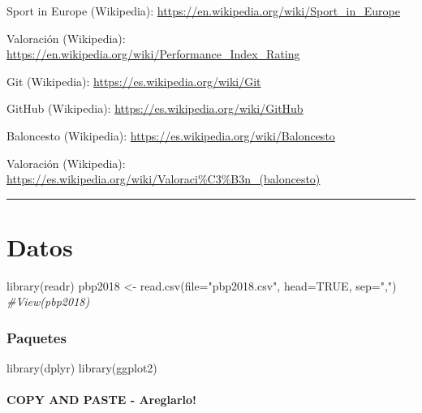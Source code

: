 \documentclass[
]{article}
\newenvironment{Shaded}{\begin{snugshade}}{\end{snugshade}}
\newcommand{\AttributeTok}[1]{\textcolor[rgb]{0.77,0.63,0.00}{#1}}
\newcommand{\CommentTok}[1]{\textcolor[rgb]{0.56,0.35,0.01}{\textit{#1}}}
\newcommand{\ConstantTok}[1]{\textcolor[rgb]{0.00,0.00,0.00}{#1}}
\newcommand{\FunctionTok}[1]{\textcolor[rgb]{0.00,0.00,0.00}{#1}}
\newcommand{\NormalTok}[1]{#1}
\newcommand{\OtherTok}[1]{\textcolor[rgb]{0.56,0.35,0.01}{#1}}
\newcommand{\StringTok}[1]{\textcolor[rgb]{0.31,0.60,0.02}{#1}}
\begin{document}
Sport in Europe (Wikipedia):
\url{https://en.wikipedia.org/wiki/Sport_in_Europe}

Valoración (Wikipedia):
\url{https://en.wikipedia.org/wiki/Performance_Index_Rating}

Git (Wikipedia): \url{https://es.wikipedia.org/wiki/Git}

GitHub (Wikipedia): \url{https://es.wikipedia.org/wiki/GitHub}

Baloncesto (Wikipedia): \url{https://es.wikipedia.org/wiki/Baloncesto}

Valoración (Wikipedia):
\url{https://es.wikipedia.org/wiki/Valoraci\%C3\%B3n_(baloncesto)}

\begin{center}\rule{0.5\linewidth}{0.5pt}\end{center}

\hypertarget{datos}{%
\section{Datos}\label{datos}}

\begin{Shaded}
\begin{Highlighting}[]
\FunctionTok{library}\NormalTok{(readr)}
\NormalTok{pbp2018 }\OtherTok{\textless{}{-}} \FunctionTok{read.csv}\NormalTok{(}\AttributeTok{file=}\StringTok{"pbp2018.csv"}\NormalTok{, }\AttributeTok{head=}\ConstantTok{TRUE}\NormalTok{, }\AttributeTok{sep=}\StringTok{","}\NormalTok{)}
\CommentTok{\#View(pbp2018)}
\end{Highlighting}
\end{Shaded}

\hypertarget{paquetes}{%
\subsubsection{Paquetes}\label{paquetes}}

\begin{Shaded}
\begin{Highlighting}[]
\FunctionTok{library}\NormalTok{(dplyr)}
\FunctionTok{library}\NormalTok{(ggplot2)}
\end{Highlighting}
\end{Shaded}

\hypertarget{copy-and-paste---areglarlo}{%
\paragraph{COPY AND PASTE -
Areglarlo!}\label{copy-and-paste---areglarlo}}
\end{document}
